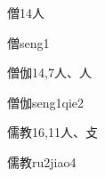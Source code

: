 \begin{entry}{僧}{14}{⼈}
  \begin{phonetics}{僧}{seng1}
  \end{phonetics}
\end{entry}

\begin{entry}{僧伽}{14,7}{⼈、⼈}
  \begin{phonetics}{僧伽}{seng1qie2}
  \end{phonetics}
\end{entry}

\begin{entry}{儒教}{16,11}{⼈、⽁}
  \begin{phonetics}{儒教}{ru2jiao4}
  \end{phonetics}
\end{entry}


